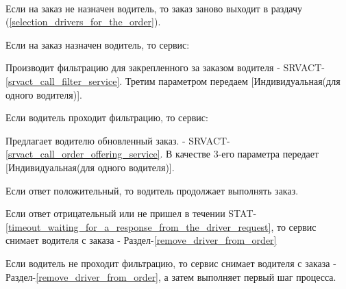     \begin{alg}\label{edit_order_alg} \mbox{}\\
        \begin{longenum}

          \item Если на заказ не назначен водитель, то заказ заново выходит в раздачу (\ref{selection_drivers_for_the_order}).

          \item Если на заказ назначен водитель, то сервис:

          \begin{longenum}

            \item Производит фильтрацию для закрепленного за заказом водителя - SRVACT-\ref{srvact_call_filter_service}. Третим параметром передаем [Индивидуальная(для одного водителя)].

              \begin{longenum}

                \item Если водитель проходит фильтрацию, то сервис:

                  \begin{longenum}

                   \item Предлагает водителю обновленный заказ. - SRVACT-\ref{srvact_call_order_offering_service}. В качестве 3-его параметра передает [Индивидуальная(для одного водителя)].

                     \begin{longenum}

                      \item Если ответ положительный, то водитель продолжает выполнять заказ.

                      \item Если ответ отрицательный или не пришел в течении STAT-\ref{timeout_waiting_for_a_response_from_the_driver_request}, то сервис снимает водителя с заказа - Раздел-\ref{remove_driver_from_order}

                     \end{longenum}

                  \end{longenum}

                \item Если водитель не проходит фильтрацию, то сервис снимает водителя с заказа - Раздел-\ref{remove_driver_from_order}, а затем выполняет первый шаг процесса.

              \end{longenum}

          \end{longenum}

        \end{longenum}

      \end{alg}
